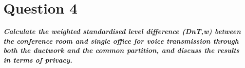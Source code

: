 \section{Question 4}

\textbf{\textit{Calculate the weighted standardised level difference (DnT,w) between the conference room and single office for voice transmission through both the ductwork and the common partition, and discuss the results in terms of privacy.}}